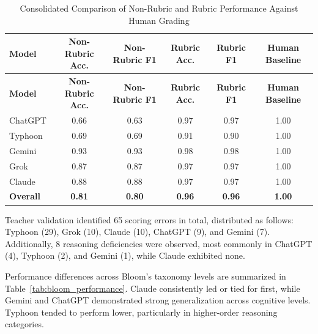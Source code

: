 {
\setlength{\LTleft}{-0.7cm}
\setlength{\LTright}{0pt}
\centering
\begin{longtable}{l c c c c c}
    \caption{Consolidated Comparison of Non-Rubric and Rubric Performance Against Human Grading}
    \label{tab:comparison_nonrubric_rubric}
    \\

    \hline
    \textbf{Model} & \textbf{Non-Rubric Acc.} & \textbf{Non-Rubric F1} & 
    \textbf{Rubric Acc.} & \textbf{Rubric F1} & \textbf{Human Baseline} \\ 
    \hline
    \endfirsthead

    \textbf{Model} & \textbf{Non-Rubric Acc.} & \textbf{Non-Rubric F1} & 
    \textbf{Rubric Acc.} & \textbf{Rubric F1} & \textbf{Human Baseline} \\ 
    \hline
    \endhead

    \hline
    \endfoot

    ChatGPT & 0.66 & 0.63 & 0.97 & 0.97 & 1.00 \\
    Typhoon & 0.69 & 0.69 & 0.91 & 0.90 & 1.00 \\
    Gemini & 0.93 & 0.93 & 0.98 & 0.98 & 1.00 \\
    Grok & 0.87 & 0.87 & 0.97 & 0.97 & 1.00 \\
    Claude & 0.88 & 0.88 & 0.97 & 0.97 & 1.00 \\
    \hline
    \textbf{Overall} & \textbf{0.81} & \textbf{0.80} & \textbf{0.96} & \textbf{0.96} & \textbf{1.00} \\

\end{longtable}
}

Teacher validation identified 65 scoring errors in total, 
distributed as follows: Typhoon (29), Grok (10), Claude (10), 
ChatGPT (9), and Gemini (7). Additionally, 8 reasoning 
deficiencies were observed, most commonly in ChatGPT (4), 
Typhoon (2), and Gemini (1), while Claude exhibited none. 

Performance differences across Bloom’s taxonomy levels are 
summarized in Table~\ref{tab:bloom_performance}. Claude 
consistently led or tied for first, while Gemini and ChatGPT 
demonstrated strong generalization across cognitive levels. 
Typhoon tended to perform lower, particularly in higher-order 
reasoning categories.

